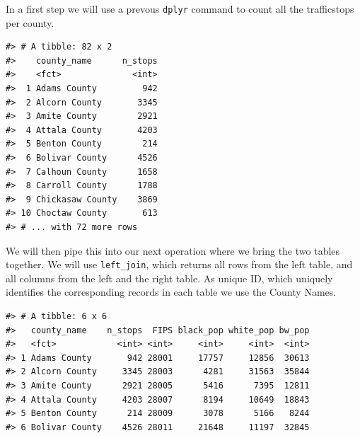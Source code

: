 \documentclass[]{book}
\newenvironment{Shaded}{\begin{snugshade}}{\end{snugshade}}
\newcommand{\DataTypeTok}[1]{\textcolor[rgb]{0.13,0.29,0.53}{#1}}
\newcommand{\KeywordTok}[1]{\textcolor[rgb]{0.13,0.29,0.53}{\textbf{#1}}}
\newcommand{\NormalTok}[1]{#1}
\newcommand{\OperatorTok}[1]{\textcolor[rgb]{0.81,0.36,0.00}{\textbf{#1}}}
\newcommand{\StringTok}[1]{\textcolor[rgb]{0.31,0.60,0.02}{#1}}
\begin{document}
In a first step we will use a prevous \texttt{dplyr} command to count all the trafficstops per county.

\begin{Shaded}
\end{Shaded}

\begin{verbatim}
#> # A tibble: 82 x 2
#>    county_name      n_stops
#>    <fct>              <int>
#>  1 Adams County         942
#>  2 Alcorn County       3345
#>  3 Amite County        2921
#>  4 Attala County       4203
#>  5 Benton County        214
#>  6 Bolivar County      4526
#>  7 Calhoun County      1658
#>  8 Carroll County      1788
#>  9 Chickasaw County    3869
#> 10 Choctaw County       613
#> # ... with 72 more rows
\end{verbatim}

We will then pipe this into our next operation where we bring the two tables together. We will use \texttt{left\_join}, which returns all rows from the left table, and all columns from the left and the right table. As unique ID, which uniquely identifies the corresponding records in each table we use the County Names.

\begin{Shaded}
\end{Shaded}

\begin{verbatim}
#> # A tibble: 6 x 6
#>   county_name    n_stops  FIPS black_pop white_pop bw_pop
#>   <fct>            <int> <int>     <int>     <int>  <int>
#> 1 Adams County       942 28001     17757     12856  30613
#> 2 Alcorn County     3345 28003      4281     31563  35844
#> 3 Amite County      2921 28005      5416      7395  12811
#> 4 Attala County     4203 28007      8194     10649  18843
#> 5 Benton County      214 28009      3078      5166   8244
#> 6 Bolivar County    4526 28011     21648     11197  32845
\end{verbatim}
\end{document}
